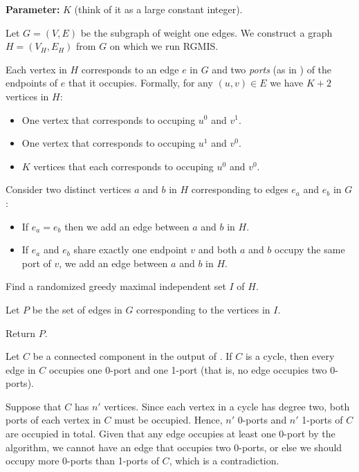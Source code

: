 \begin{algorithm}[H]
\caption{A modification of \algone{} that uses RGMIS.}
\label{alg:path-cover22}

\textbf{Parameter:} $K$ (think of it as a large constant integer).

Let $G=(V, E)$ be the subgraph of weight one edges. We construct a graph $H=(V_H, E_H)$ from $G$ on which we run RGMIS.
    
Each vertex in $H$ corresponds to an edge $e$ in $G$ and two {\em ports} (as in \algone{}) of the endpoints of $e$ that it occupies. Formally, for any $(u, v) \in E$ we have $K + 2$ vertices in $H$:
{
    \begin{itemize}[itemsep=-2pt,topsep=2pt]
        \item One vertex that corresponds to occuping $u^0$ and $v^1$.
        \item One vertex that corresponds to occuping $u^1$ and $v^0$.
        \item $K$ vertices that each corresponds to occuping $u^0$ and $v^0$.
    \end{itemize}
}

    
Consider two distinct vertices $a$ and $b$ in $H$ corresponding to edges $e_a$ and $e_b$ in $G$:
  
{ 
\begin{itemize}[itemsep=-2pt,topsep=2pt]
        \item If $e_a = e_b$ then we add an edge between $a$ and $b$ in $H$.
        \item If $e_a$ and $e_b$ share exactly one endpoint $v$ and both $a$ and $b$ occupy the same port of $v$, we add an edge between $a$ and $b$ in $H$.
    \end{itemize}
}
    
Find a randomized greedy maximal independent set $I$ of $H$.
    
Let $P$ be the set of edges in $G$ corresponding to the vertices in $I$.
    
Return $P$.


\end{algorithm}


\begin{observation}\label{obs:no-zero-cycle}
Let $C$ be a connected component in the output of \algtwo{}. If $C$ is a cycle, then every edge in $C$ occupies one 0-port and one 1-port (that is, no edge occupies two 0-ports).
\end{observation}
\begin{myproof}
    Suppose that $C$ has $n'$ vertices. Since each vertex in a cycle has degree two, both ports of each vertex in $C$ must be occupied. Hence, $n'$ 0-ports and $n'$ 1-ports of $C$ are occupied in total. Given that any edge occupies at least one 0-port by the algorithm, we cannot have an edge that occupies two 0-ports, or else we should occupy more 0-ports than 1-ports of $C$, which is a contradiction.
\end{myproof}

